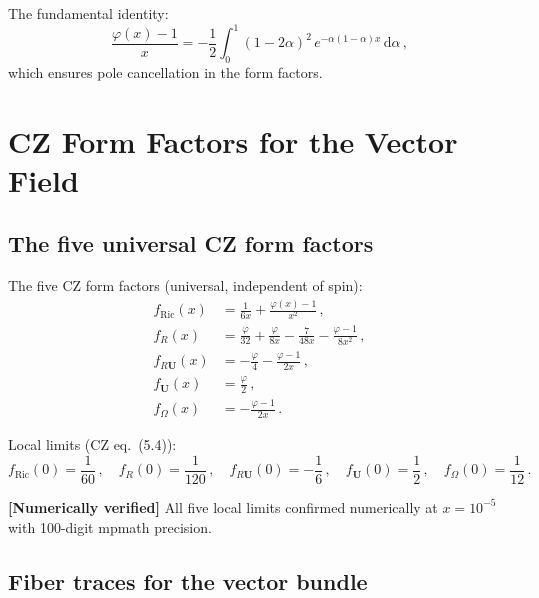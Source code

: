 \documentclass[11pt,a4paper]{article}
\newcommand{\dd}{\mathrm{d}}
\theoremstyle{definition}
\theoremstyle{remark}
\newcommand{\verified}[1]{%
  \par\noindent\colorbox{green!10}{%
    \parbox{\dimexpr\linewidth-2\fboxsep}{%
      \textcolor{green!50!black}{\textbf{[Numerically verified]}}
      \textcolor{green!50!black}{#1}%
    }%
  }\par%
}
\begin{document}
The fundamental identity:
\begin{equation}
  \frac{\varphi(x) - 1}{x}
  = -\frac{1}{2}\int_0^1 (1-2\alpha)^2\,e^{-\alpha(1-\alpha)x}\,\dd\alpha\,,
  \label{eq:phi-identity}
\end{equation}
which ensures pole cancellation in the form factors.


\section{CZ Form Factors for the Vector Field}
\label{sec:CZ}

\subsection{The five universal CZ form factors}

The five CZ form factors (universal, independent of spin):
\begin{align}
  f_{\mathrm{Ric}}(x) &= \frac{1}{6x} + \frac{\varphi(x) - 1}{x^2}\,,
  \label{eq:f-Ric}\\[4pt]
  f_R(x) &= \frac{\varphi}{32} + \frac{\varphi}{8x}
    - \frac{7}{48x} - \frac{\varphi - 1}{8x^2}\,,
  \label{eq:f-R}\\[4pt]
  f_{R\mathbf{U}}(x) &= -\frac{\varphi}{4}
    - \frac{\varphi - 1}{2x}\,,
  \label{eq:f-RU}\\[4pt]
  f_{\mathbf{U}}(x) &= \frac{\varphi}{2}\,,
  \label{eq:f-U}\\[4pt]
  f_\Omega(x) &= -\frac{\varphi - 1}{2x}\,.
  \label{eq:f-Omega}
\end{align}

Local limits (CZ eq.~(5.4)):
\begin{equation}
  \boxed{
  f_{\mathrm{Ric}}(0) = \frac{1}{60}\,,\quad
  f_R(0) = \frac{1}{120}\,,\quad
  f_{R\mathbf{U}}(0) = -\frac{1}{6}\,,\quad
  f_{\mathbf{U}}(0) = \frac{1}{2}\,,\quad
  f_\Omega(0) = \frac{1}{12}\,.
  }
  \label{eq:f-at-0}
\end{equation}

\verified{All five local limits confirmed numerically at
$x = 10^{-5}$ with 100-digit mpmath precision.}


\subsection{Fiber traces for the vector bundle}
\label{sec:traces}
\end{document}
